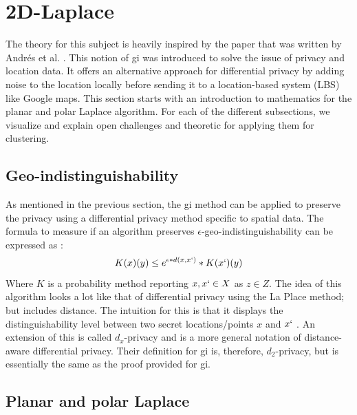 
\section{2D-Laplace}
The theory for this subject is heavily inspired by the paper that was written by Andrés et al. \citep{DBLP:journals/corr/abs-1212-1984}.
This notion of \gls{gi} was introduced to solve the issue of privacy and location data.
It offers an alternative approach for differential privacy by adding noise to the location locally before sending it to a location-based system (LBS) like Google maps.
This section starts with an introduction to mathematics for the planar and polar Laplace algorithm.
For each of the different subsections, we visualize and explain open challenges and theoretic for applying them for clustering.
\glsaddall
\leading{10pt}
\printglossary[type=genericmath, nonumberlist]
\subsection*{Geo-indistinguishability}
As mentioned in the previous section, the \gls{gi} method can be applied to preserve the privacy using a differential privacy method specific to spatial data.
The formula to measure if an algorithm preserves $\epsilon$-geo-indistinguishability can be expressed as \citep{DBLP:journals/corr/abs-1212-1984}:
\begin{equation}
  K(x)(y) \le e^{\epsilon * d(x,x`)} * K(x`)(y)
  \label{algo:2d-geo-indistinguishability}
\end{equation}
Where $K$ is a probability method reporting $x, x` \in X$ as $z \in Z$.
The idea of this algorithm looks a lot like that of differential privacy using the La Place method; but includes distance.
The intuition for this is that it displays the distinguishability level between two secret locations/points $x$ and $x`$ \citep{chatzikokolakis_constructing_2015}.
An extension of this is called $d_x$-privacy and is a more general notation of distance-aware differential privacy.
Their definition for \gls{gi} is, therefore, $d_2$-privacy, but is essentially the same as the proof provided for \gls{gi}.

\subsection{Planar and polar Laplace}
\printglossary[type=2dlaplace]

